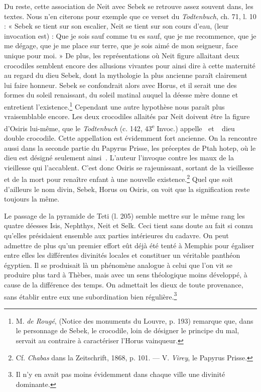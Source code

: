 \documentclass[a4paper, 11pt, oneside]{article}
\newcommand*\hieroAADB{}
\newcommand*\hieroAAGT{}
\newcommand*\hieroAAJG{}
\begin{document}
Du reste, cette association de Neit avec Sebek se retrouve assez souvent dans, les textes. Nous n'en citerons pour exemple que ce verset du \emph{Todtenbuch}, ch. 71, l. 10 : « Sebek se tient sur son escalier, Neit se tient sur son cours d'eau, (leur invocation est) : Que je sois sauf comme tu es sauf, que je me recommence, que je me dégage, que je me place sur terre, que je sois aimé de mon seigneur, face unique pour moi. » De plus, les représentations où Neit figure allaitant deux crocodiles semblent encore des allusions vivantes pour ainsi dire à cette maternité au regard du dieu Sebek, dont la mythologie la plus ancienne paraît clairement lui faire honneur. Sebek se confondrait alors avec Horus, et il serait une des formes du soleil renaissant, du soleil matinal auquel la déesse mère donne et entretient l'existence.\footnote{M. \emph{de Rougé}, (Notice des monuments du Louvre, p. 193) remarque que, dans le personnage de Sebek, le crocodile, loin de désigner le principe du mal, servait au contraire à caractériser l'Horus vainqueur.} Cependant une autre hypothèse nous paraît plus vraisemblable encore. Les deux crocodiles allaités par Neit doivent être la figure d'Osiris lui-même, que le \emph{Todtenbuch} (c. 142, 43\textsuperscript{e} Invoc.) appelle $\hieroAAGT\:\hieroAADB$ et $\hieroAAJG\:\hieroAAGT\:\hieroAADB$ dieu double crocodile. Cette appellation est évidemment fort ancienne. On la rencontre aussi dans la seconde partie du Papyrus Prisse, les préceptes de Ptah hotep, où le dieu est désigné seulement ainsi $\hieroAAGT\:\hieroAADB$. L'auteur l'invoque contre les maux de la vieillesse qui l'accablent. C'est donc Osiris se rajeunissant, sortant de la vieillesse et de la mort pour renaître enfant à une nouvelle existence.\footnote{Cf. \emph{Chabas} dans la Zeitschrift, 1868, p. 101. --- V. \emph{Virey}, le Papyrus Prisse.} Quel que soit d'ailleurs le nom divin, Sebek, Horus ou Osiris, on voit que la signification reste toujours la même.

Le passage de la pyramide de Teti (l. 205) semble mettre sur le même rang les quatre déesses Isis, Nephthys, Neit et Selk. Ceci tient sans doute au fait si connu qu'elles présidaient ensemble aux parties intérieures du cadavre. On peut admettre de plus qu'un premier effort eût déjà été tenté à Memphis pour égaliser entre elles les différentes divinités locales et constituer un véritable panthéon égyptien. Il se produisait là un phénomène analogue à celui que l'on vit se produire plus tard à Thèbes, mais avec un sens théologique moins développé, à cause de la différence des temps. On admettait les dieux de toute provenance, sans établir entre eux une subordination bien régulière.\footnote{Il n'y en avait pas moins évidemment dans chaque ville une divinité dominante.}
\end{document}
